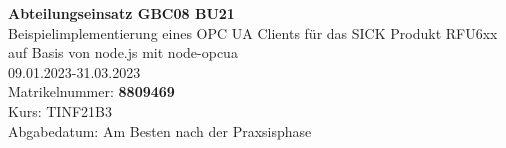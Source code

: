 \documentclass[
  ngerman
  ,a4paper
  ,12pt
  ,pdftex
]{article}
\begin{document}
\begin{titlepage}
  \begin{center}
      {\Huge \textbf{Abteilungseinsatz GBC08 BU21}}\\[1.5cm]
      {\Large Beispielimplementierung eines OPC UA Clients für das SICK Produkt RFU6xx auf Basis von node.js mit node-opcua}\\[1cm]
      {\Huge 09.01.2023-31.03.2023}\\[7cm]
      {\large Matrikelnummer: \textbf{8809469}}\\[0.5cm]
     
      {\large Kurs: TINF21B3}\\[0.5cm]
      {\large Abgabedatum: Am Besten nach der Praxsisphase}
      \vfill
  \end{center}
\end{titlepage}
\newpage
\tableofcontents
\newpage





\end{document}
